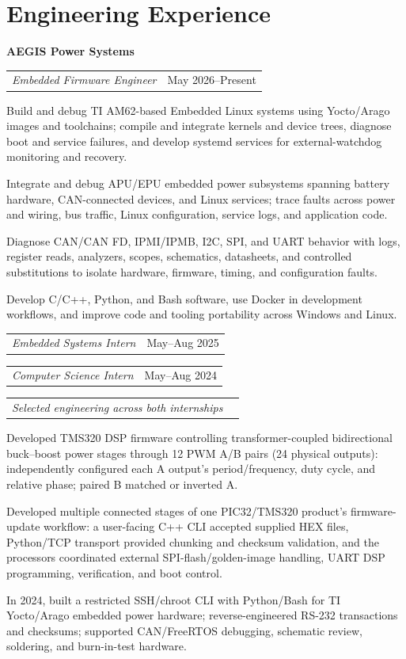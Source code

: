\documentclass[10pt,letterpaper]{article}
\makeatletter
\newcommand{\companyheader}[1]{%
  {\fontsize{10.4}{10.8}\selectfont\bfseries #1}\par\vspace{-0.03cm}
}
\newcommand{\roleentry}[2]{%
  \begin{tabularx}{\textwidth}{@{}X>{\raggedleft\arraybackslash}p{2.40in}@{}}
    \textit{#1} & #2
  \end{tabularx}\vspace{-0.075cm}
}
\makeatother
\begin{document}
\section{Engineering Experience}
\companyheader{AEGIS Power Systems}
\roleentry{Embedded Firmware Engineer}{May 2026--Present}
\begin{resumebullets}
  \item Build and debug TI AM62-based Embedded Linux systems using Yocto/Arago images and toolchains; compile and integrate kernels and device trees, diagnose boot and service failures, and develop systemd services for external-watchdog monitoring and recovery.
  \item Integrate and debug APU/EPU embedded power subsystems spanning battery hardware, CAN-connected devices, and Linux services; trace faults across power and wiring, bus traffic, Linux configuration, service logs, and application code.
  \item Diagnose CAN/CAN FD, IPMI/IPMB, I2C, SPI, and UART behavior with logs, register reads, analyzers, scopes, schematics, datasheets, and controlled substitutions to isolate hardware, firmware, timing, and configuration faults.
  \item Develop C/C++, Python, and Bash software, use Docker in development workflows, and improve code and tooling portability across Windows and Linux.
\end{resumebullets}

\roleentry{Embedded Systems Intern}{May--Aug 2025}
\roleentry{Computer Science Intern}{May--Aug 2024}
\roleentry{Selected engineering across both internships}{}
\begin{resumebullets}
  \item Developed TMS320 DSP firmware controlling transformer-coupled bidirectional buck--boost power stages through 12 PWM A/B pairs (24 physical outputs): independently configured each A output's period/frequency, duty cycle, and relative phase; paired B matched or inverted A.
  \item Developed multiple connected stages of one PIC32/TMS320 product's firmware-update workflow: a user-facing C++ CLI accepted supplied HEX files, Python/TCP transport provided chunking and checksum validation, and the processors coordinated external SPI-flash/golden-image handling, UART DSP programming, verification, and boot control.
  \item In 2024, built a restricted SSH/chroot CLI with Python/Bash for TI Yocto/Arago embedded power hardware; reverse-engineered RS-232 transactions and checksums; supported CAN/FreeRTOS debugging, schematic review, soldering, and burn-in-test hardware.
\end{resumebullets}
\end{document}
